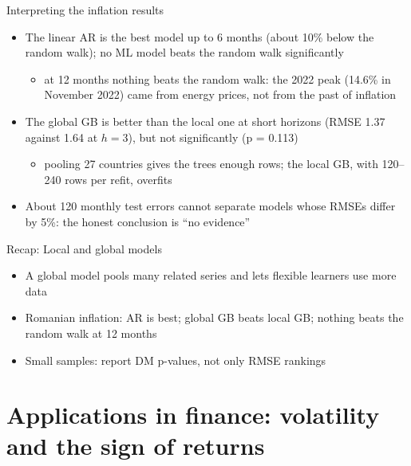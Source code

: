 \begin{frame}{Interpreting the inflation results}
\itemsize{\small}
\begin{itemize}
    \item The linear AR is the best model up to 6 months (about 10\% below the random walk); no ML model beats the random walk significantly
    \begin{itemize}
        \item at 12 months nothing beats the random walk: the 2022 peak (14.6\% in November 2022) came from energy prices, not from the past of inflation
    \end{itemize}
    \item The global GB is better than the local one at short horizons (RMSE 1.37 against 1.64 at $h = 3$), but not significantly (p = 0.113)
    \begin{itemize}
        \item pooling 27 countries gives the trees enough rows; the local GB, with 120--240 rows per refit, overfits
    \end{itemize}
    \item About 120 monthly test errors cannot separate models whose RMSEs differ by 5\%: the honest conclusion is ``no evidence''
\end{itemize}
\end{frame}

\begin{frame}{Recap: Local and global models}
\itemsize{\small}
\begin{itemize}
    \item A global model pools many related series and lets flexible learners use more data
    \item Romanian inflation: AR is best; global GB beats local GB; nothing beats the random walk at 12 months
    \item Small samples: report DM p-values, not only RMSE rankings
\end{itemize}
\end{frame}


\section{Applications in finance: volatility and the sign of returns}

